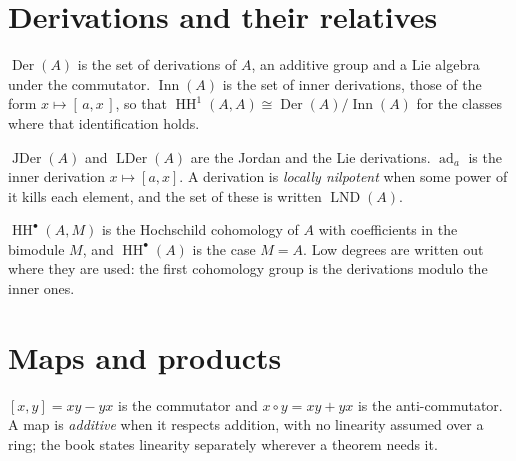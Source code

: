 \section*{Derivations and their relatives}

$\operatorname{Der}(A)$ is the set of derivations of $A$, an additive group and %
a Lie algebra under the commutator. %
$\operatorname{Inn}(A)$ is the set of inner derivations, those of the form %
$x\mapsto[\,a,x\,]$, so that %
$\operatorname{HH}^{1}(A,A)\cong\operatorname{Der}(A)/\operatorname{Inn}(A)$ for %
the classes where that identification holds. %

$\operatorname{JDer}(A)$ and $\operatorname{LDer}(A)$ are the Jordan and the Lie %
derivations. $\operatorname{ad}_a$ is the inner derivation $x\mapsto[a,x]$. %
A derivation is \emph{locally nilpotent} when some power of it kills each %
element, and the set of these is written $\operatorname{LND}(A)$. %

$\operatorname{HH}^{\bullet}(A,M)$ is the Hochschild cohomology of $A$ with %
coefficients in the bimodule $M$, and $\operatorname{HH}^{\bullet}(A)$ is the %
case $M=A$. %
Low degrees are written out where they are used: the first cohomology group is %
the derivations modulo the inner ones. %

\section*{Maps and products}

$[x,y]=xy-yx$ is the commutator and $x\circ y=xy+yx$ is the anti-commutator. %
A map is \emph{additive} when it respects addition, with no linearity assumed %
over a ring; the book states linearity separately wherever a theorem needs it. %

